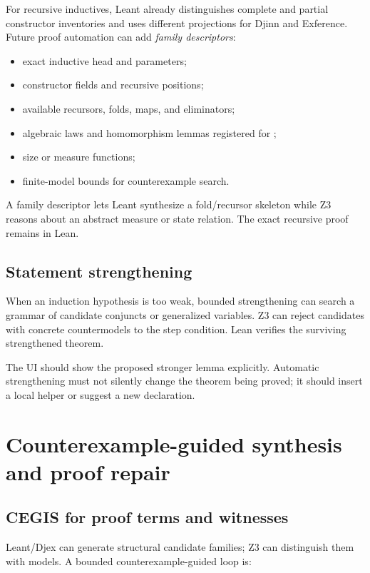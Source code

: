 \documentclass[11pt,letterpaper,openany]{report}
\newcommand{\code}[1]{\texttt{\detokenize{#1}}}
\begin{document}
For recursive inductives, Leant already distinguishes complete and partial constructor
inventories and uses different projections for Djinn and Exference. Future proof
automation can add \emph{family descriptors}:

\begin{itemize}
  \item exact inductive head and parameters;
  \item constructor fields and recursive positions;
  \item available recursors, folds, maps, and eliminators;
  \item algebraic laws and homomorphism lemmas registered for \code{grind};
  \item size or measure functions;
  \item finite-model bounds for counterexample search.
\end{itemize}

A family descriptor lets Leant synthesize a fold/recursor skeleton while Z3 reasons
about an abstract measure or state relation. The exact recursive proof remains in Lean.

\section{Statement strengthening}

When an induction hypothesis is too weak, bounded strengthening can search a grammar of
candidate conjuncts or generalized variables. Z3 can reject candidates with concrete
countermodels to the step condition. Lean verifies the surviving strengthened theorem.

The UI should show the proposed stronger lemma explicitly. Automatic strengthening
must not silently change the theorem being proved; it should insert a local helper or
suggest a new declaration.

\chapter{Counterexample-guided synthesis and proof repair}
\label{ch:cegis}

\section{CEGIS for proof terms and witnesses}

Leant/Djex can generate structural candidate families; Z3 can distinguish them with
models. A bounded counterexample-guided loop is:
\end{document}
